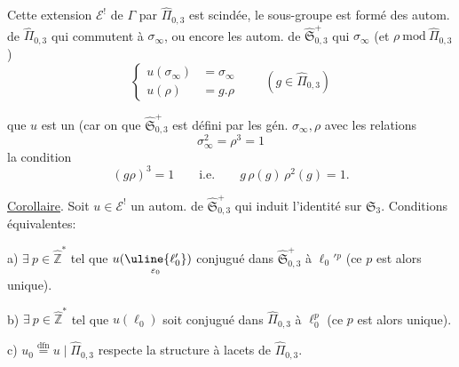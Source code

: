 Cette extension $\mathcal E^{!}$ de $\Gamma$ par $\widehat{\Pi}_{0,3}$ est
scindée, le sous-groupe  est formé
des autom. de $\widehat{\Pi}_{0,3}$ qui commutent à $\sigma_\infty$,
ou encore les autom. de $\widehat{\mathfrak S}_{0,3}^{+}$ qui
  $\sigma_\infty$ (et  $\rho\ \mathrm{mod}\ \widehat{\Pi}_{0,3}$)
\[
\left\{
\begin{aligned}
u(\sigma_\infty)&=\sigma_\infty\\
u(\rho)&=g.\rho
\end{aligned}
\right.
\qquad(g\in\widehat{\Pi}_{0,3})
\tag{36}
\]


 que $u$ est un  (car on 
que $\widehat{\mathfrak S}_{0,3}^{+}$ est défini par les gén. $\sigma_\infty,\rho$
avec les relations
\begin{equation}
\sigma_\infty^2=\rho^3=1
\tag{37}
\end{equation}
 la condition
\begin{equation}
(g\rho)^3=1\qquad\text{i.e.}\qquad g\,\rho(g)\,\rho^2(g)=1.
\tag{38}
\end{equation}


\uline{Corollaire}. Soit $u\in\mathcal E^{!}$ un autom. de
$\widehat{\mathfrak S}_{0,3}^{+}$ qui induit l'identité sur $\mathfrak S_3$.
Conditions équivalentes:

a) $\exists\ p\in\widehat{\mathbb Z}^{*}$ tel que
$u(\underset{\varepsilon_0}{\uline{\ell'_0}})$ conjugué dans
$\widehat{\mathfrak S}_{0,3}^{+}$ à $\ell_0'{}^p$
(ce $p$ est alors unique).

b) $\exists\ p\in\widehat{\mathbb Z}^{*}$ tel que $u(\ell_0)$ soit conjugué dans
$\widehat\Pi_{0,3}$ à $\ell_0^p$ (ce $p$ est alors unique).

c) $u_0\overset{\mathrm{dfn}}{=}u\mid\widehat\Pi_{0,3}$ respecte la structure à lacets de $\widehat\Pi_{0,3}$.

